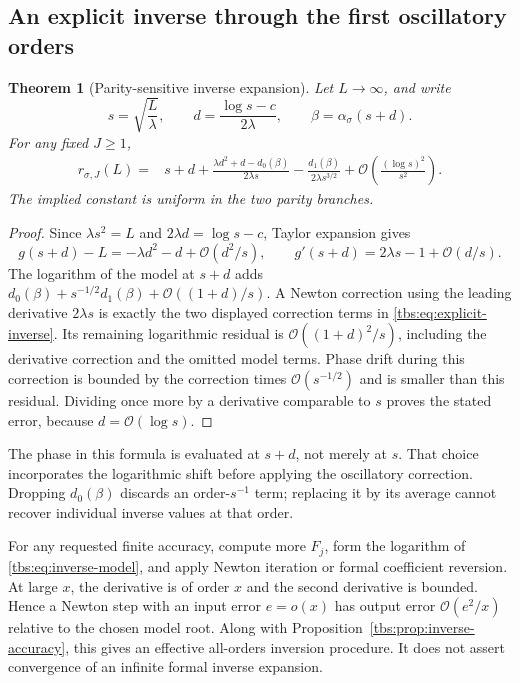 \documentclass[11pt,a4paper]{article}
\numberwithin{equation}{section}
\newtheorem{theorem}{Theorem}[section]
\theoremstyle{definition}
\newcommand{\OO}{\mathcal O}
\begin{document}
\subsection{An explicit inverse through the first oscillatory orders}
\begin{theorem}[Parity-sensitive inverse expansion]\label{tbs:thm:inverse}
Let $L\to\infty$, and write
\begin{equation}\label{tbs:eq:inverse-variables}
 s=\sqrt{\frac{L}{\lambda}},\qquad
 d=\frac{\log s-c}{2\lambda},\qquad
 \beta=\alpha_\sigma(s+d).
\end{equation}
For any fixed $J\ge1$,
\begin{align}\label{tbs:eq:explicit-inverse}
 r_{\sigma,J}(L)
 ={}&s+d+\frac{\lambda d^2+d-d_0(\beta)}{2\lambda s}
       -\frac{d_1(\beta)}{2\lambda s^{3/2}}
       +\OO\!\left(\frac{(\log s)^2}{s^2}\right).
\end{align}
The implied constant is uniform in the two parity branches.
\end{theorem}
\begin{proof}
Since $\lambda s^2=L$ and $2\lambda d=\log s-c$,
Taylor expansion gives
\[
 g(s+d)-L=-\lambda d^2-d+\OO(d^2/s),
 \qquad g'(s+d)=2\lambda s-1+\OO(d/s).
\]
The logarithm of the model at $s+d$ adds
$d_0(\beta)+s^{-1/2}d_1(\beta)+\OO((1+d)/s)$.
A Newton correction using the leading derivative $2\lambda s$ is
exactly the two displayed correction terms in
\eqref{tbs:eq:explicit-inverse}. Its remaining logarithmic residual is
$\OO((1+d)^2/s)$, including the derivative correction and the omitted
model terms. Phase drift during this correction is bounded by the
correction times $\OO(s^{-1/2})$ and is smaller than this residual.
Dividing once more by a derivative comparable to $s$ proves the stated
error, because $d=\OO(\log s)$.
\end{proof}

The phase in this formula is evaluated at $s+d$, not merely at $s$.
That choice incorporates the logarithmic shift before applying the
oscillatory correction. Dropping $d_0(\beta)$ discards an order-$s^{-1}$
term; replacing it by its average cannot recover individual inverse
values at that order.

For any requested finite accuracy, compute more $F_j$, form the
logarithm of \eqref{tbs:eq:inverse-model}, and apply Newton iteration or
formal coefficient reversion. At large $x$, the derivative is of order
$x$ and the second derivative is bounded. Hence a Newton step with an
input error $e=o(x)$ has output error $\OO(e^2/x)$ relative to the
chosen model root. Along with Proposition~\ref{tbs:prop:inverse-accuracy},
this gives an effective all-orders inversion procedure. It does not
assert convergence of an infinite formal inverse expansion.
\end{document}
